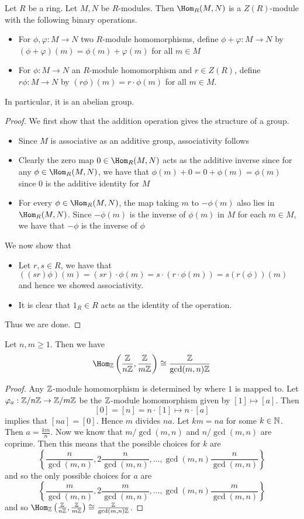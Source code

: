 \documentclass[a4paper]{article}
\begin{document}
\begin{prp}{}{} Let $R$ be a ring. Let $M,N$ be $R$-modules. Then $\Hom_R(M,N)$ is a $Z(R)$-module with the following binary operations. 
\begin{itemize}
\item For $\phi,\varphi:M\to N$ two $R$-module homomorphisms, define $\phi+\varphi:M\to N$ by $(\phi+\varphi)(m)=\phi(m)+\varphi(m)$ for all $m\in M$
\item For $\phi:M\to N$ an $R$-module homomorphism and $r\in Z(R)$, define $r\phi:M\to N$ by $(r\phi)(m)=r\cdot\phi(m)$ for all $m\in M$. 
\end{itemize} 
In particular, it is an abelian group. 
\begin{proof}
We first show that the addition operation gives the structure of a group. 
\begin{itemize}
\item Since $M$ is associative as an additive group, associativity follows
\item Clearly the zero map $0\in\Hom_R(M,N)$ acts as the additive inverse since for any $\phi\in\Hom_R(M,N)$, we have that $\phi(m)+0=0+\phi(m)=\phi(m)$ since $0$ is the additive identity for $M$
\item For every $\phi\in\Hom_R(M,N)$, the map taking $m$ to $-\phi(m)$ also lies in $\Hom_R(M,N)$. Since $-\phi(m)$ is the inverse of $\phi(m)$ in $M$ for each $m\in M$, we have that $-\phi$ is the inverse of $\phi$
\end{itemize}
We now show that 
\begin{itemize}
\item Let $r,s\in R$, we have that $((sr)\phi)(m)=(sr)\cdot\phi(m)=s\cdot(r\cdot\phi(m))=s(r(\phi))(m)$ and hence we showed associativity. 
\item It is clear that $1_R\in R$ acts as the identity of the operation. 
\end{itemize}
Thus we are done. 
\end{proof}
\end{prp}

\begin{eg}{}{} Let $n,m\geq 1$. Then we have $$\Hom_\Z\left(\frac{\Z}{n\Z},\frac{\Z}{m\Z}\right)\cong\frac{\Z}{\gcd(m,n)\Z}$$ 
\begin{proof}
Any $\mathbb{Z}$-module homomorphism is determined by where $1$ is mapped to. Let $\varphi_a:\mathbb{Z}/n\mathbb{Z}\to\mathbb{Z}/m\mathbb{Z}$ be the $\mathbb{Z}$-module homomorphism given by $[1]\mapsto[a]$. Then $$[0]=[n]=n\cdot[1]\mapsto n\cdot[a]$$ implies that $[na]=[0]$. Hence $m$ divides $na$. Let $km=na$ for some $k\in\mathbb{N}$. Then $a=\frac{km}{n}$. Now we know that $m/\gcd(m,n)$ and $n/\gcd(m,n)$ are coprime. Then this means that the possible choices for $k$ are $$\left\{\frac{n}{\gcd(m,n)},2\frac{n}{\gcd(m,n)},\dots,\gcd(m,n)\frac{n}{\gcd(m,n)}\right\}$$ and so the only possible choices for $a$ are $$\left\{\frac{m}{\gcd(m,n)},2\frac{m}{\gcd(m,n)},\dots,\gcd(m,n)\frac{m}{\gcd(m,n)}\right\}$$ and so $\Hom_\Z\left(\frac{\Z}{n\Z},\frac{\Z}{m\Z}\right)\cong\frac{\Z}{\gcd(m,n)\Z}$. 
\end{proof}
\end{eg}
\end{document}
